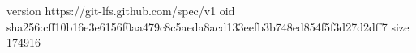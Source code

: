 version https://git-lfs.github.com/spec/v1
oid sha256:cff10b16e3e6156f0aa479c8c5aeda8acd133eefb3b748ed854f5f3d27d2dff7
size 174916
